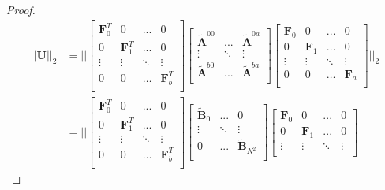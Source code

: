 \documentclass{article} %
\theoremstyle{definition}
\begin{document}
\begin{proof}
\begin{equation}
\begin{split}
||\boldsymbol{U}||_2 
& =
||
\begin{bmatrix}
    \boldsymbol{F}_{0}^{T}  & 0 & ... & 0  \\
    0  & \boldsymbol{F}_{1}^{T} & ... & 0  \\
    \vdots  & \vdots & \ddots & \vdots  \\
    0  & 0 & \hdots & \boldsymbol{F}_{b}^{T}  \\
\end{bmatrix}
\begin{bmatrix}
    \boldsymbol{\tilde{A} }^{00}  & ... & \boldsymbol{\tilde{A}}^{0a}  \\
    \vdots  & \ddots & \vdots  \\
    \boldsymbol{\tilde{A}}^{b0}  & ... & \boldsymbol{\tilde{A}}^{ba}  \\
\end{bmatrix}
\begin{bmatrix}
    \boldsymbol{F}_{0}  & 0 & ... & 0  \\
    0  & \boldsymbol{F}_{1} & ... & 0  \\
    \vdots  & \vdots & \ddots & \vdots  \\
    0  & 0 & \hdots & \boldsymbol{F}_{a}  \\
\end{bmatrix}||_2 \\
& =
||
\begin{bmatrix}
    \boldsymbol{F}_{0}^{T}  & 0 & ... & 0  \\
    0  & \boldsymbol{F}_{1}^{T} & ... & 0  \\
    \vdots  & \vdots & \ddots & \vdots  \\
    0  & 0 & \hdots & \boldsymbol{F}_{b}^{T}  \\
\end{bmatrix}
\begin{bmatrix}
    \boldsymbol{\tilde{B}}_{0}  & ... & 0  \\
    \vdots  & \ddots & \vdots  \\
    0  & ... & \boldsymbol{\tilde{B}}_{N^2}  \\
\end{bmatrix}
\begin{bmatrix}
    \boldsymbol{F}_{0}  & 0 & ... & 0  \\
    0  & \boldsymbol{F}_{1} & ... & 0  \\
    \vdots  & \vdots & \ddots & \vdots  \\

\end{bmatrix}
\end{split}
\end{equation}
\end{proof}
\end{document}

